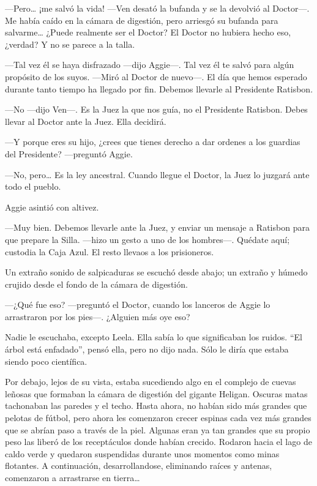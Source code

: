 ---Pero\ldots{} ¡me salvó la vida! ---Ven desató la bufanda y se la
devolvió al Doctor---. Me había caído en la cámara de digestión, pero
arriesgó su bufanda para salvarme\ldots{} ¿Puede realmente ser el
Doctor? El Doctor no hubiera hecho eso, ¿verdad? Y no se parece a la
talla.

---Tal vez él se haya disfrazado ---dijo Aggie---. Tal vez él te salvó
para algún propósito de los suyos. ---Miró al Doctor de nuevo---. El día
que hemos esperado durante tanto tiempo ha llegado por fin. Debemos
llevarle al Presidente Ratisbon.

---No ---dijo Ven---. Es la Juez la que nos guía, no el Presidente
Ratisbon. Debes llevar al Doctor ante la Juez. Ella decidirá.

---Y porque eres su hijo, ¿crees que tienes derecho a dar ordenes a los
guardias del Presidente? ---preguntó Aggie.

---No, pero\ldots{} Es la ley ancestral. Cuando llegue el Doctor, la
Juez lo juzgará ante todo el pueblo.

Aggie asintió con altivez.

---Muy bien. Debemos llevarle ante la Juez, y enviar un mensaje a
Ratisbon para que prepare la Silla. ---hizo un gesto a uno de los
hombres---. Quédate aquí; custodia la Caja Azul. El resto llevaos a los
prisioneros.

Un extraño sonido de salpicaduras se escuchó desde abajo; un extraño y
húmedo crujido desde el fondo de la cámara de digestión.

---¿Qué fue eso? ---preguntó el Doctor, cuando los lanceros de Aggie lo
arrastraron por los pies---. ¿Alguien más oye eso?

Nadie le escuchaba, excepto Leela. Ella sabía lo que significaban los
ruidos. ``El árbol está enfadado'', pensó ella, pero no dijo nada. Sólo
le diría que estaba siendo poco científica.

Por debajo, lejos de su vista, estaba sucediendo algo en el complejo de
cuevas leñosas que formaban la cámara de digestión del gigante Heligan.
Oscuras matas tachonaban las paredes y el techo. Hasta ahora, no habían
sido más grandes que pelotas de fútbol, pero ahora les comenzaron crecer
espinas cada vez más grandes que se abrían paso a través de la piel.
Algunas eran ya tan grandes que su propio peso las liberó de los
receptáculos donde habían crecido. Rodaron hacia el lago de caldo verde
y quedaron suspendidas durante unos momentos como minas flotantes. A
continuación, desarrollandose, eliminando raíces y antenas, comenzaron a
arrastrarse en tierra\ldots{}